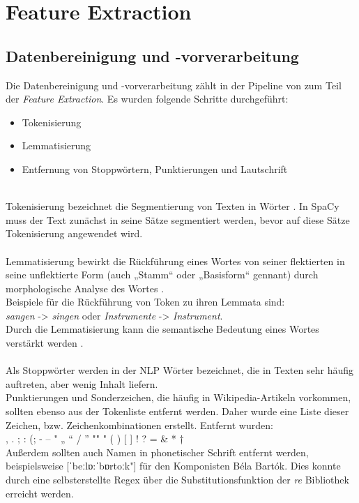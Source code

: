 \documentclass[ngerman]{ttlab-qualify}
\begin{document}
\section{Feature Extraction} \label{Feature Extraction}
\subsection{Datenbereinigung und -vorverarbeitung} \label{Datenbereinigung}
Die Datenbereinigung und -vorverarbeitung zählt in der Pipeline von \textcite{Kowsari_2019} zum Teil der \textit{Feature Extraction}. Es wurden folgende Schritte durchgeführt:
\begin{itemize}
    \item Tokenisierung
    \item Lemmatisierung
    \item Entfernung von Stoppwörtern, Punktierungen und Lautschrift
\end{itemize}
\\
Tokenisierung bezeichnet die Segmentierung von Texten in Wörter \parencite{Jurafsky:2009:SLP:1214993}.
In SpaCy muss der Text zunächst in seine Sätze segmentiert werden, bevor auf diese Sätze Tokenisierung angewendet wird.\\
\\
Lemmatisierung bewirkt die Rückführung eines Wortes von seiner flektierten in seine unflektierte Form (auch „Stamm“ oder  „Basisform“ gennant) durch morphologische Analyse des Wortes \parencite{Jurafsky:2009:SLP:1214993}. \\
Beispiele für die Rückführung von Token zu ihren Lemmata sind:\\ 
\textit{sangen} -> \textit{singen} oder \textit{Instrumente} -> \textit{Instrument}.\\
Durch die Lemmatisierung kann die semantische Bedeutung eines Wortes verstärkt werden \parencite{Liu2020}.\\
\\
Als Stoppwörter werden in der NLP Wörter bezeichnet, die in Texten sehr häufig auftreten, aber wenig Inhalt liefern.\\
Punktierungen und Sonderzeichen, die häufig in Wikipedia-Artikeln vorkommen, sollten ebenso aus der Tokenliste entfernt werden. Daher wurde eine Liste dieser Zeichen, bzw. Zeichenkombinationen erstellt. Entfernt wurden:\\
, . ; : (; - – " „  “ / '' "" " ( ) [ ] ! ? = { } \& * † \\
Außerdem sollten auch Namen in phonetischer Schrift entfernt werden, beispielsweise [ˈbeːlɒ:ˈbɒrtoːk"] für den Komponisten Béla Bartók. Dies konnte durch eine selbsterstellte Regex über die Substitutionsfunktion der \textit{re} Bibliothek erreicht werden. 
\end{document}

